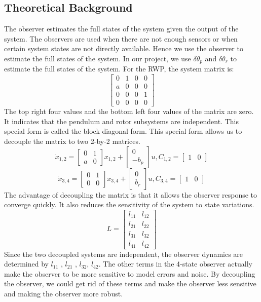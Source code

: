 \subsection{Theoretical Background}
The observer estimates the full states of the system given the output of the system. The observers are used when there are not enough sensors or when certain system states are not directly available. Hence we use the observer to estimate the full states of the system.  In our project, we use $\delta\theta_p$ and $\delta\theta_r$ to estimate the full states of the system.
For the RWP, the system matrix is:
$$
\begin{bmatrix}
0 & 1 & 0 & 0\\
a & 0 & 0 & 0\\
0 & 0 & 0 & 1\\
0 & 0 & 0 & 0
\end{bmatrix}
$$
The top right four values and the bottom left four values of the matrix are zero. It indicates that the pendulum and rotor subsystems are independent. This special form is called the block diagonal form. This special form allows us to decouple the matrix to two 2-by-2 matrices.
$$\dot x_{1,2} = 
\begin{bmatrix}
0 & 1 \\
a & 0
\end{bmatrix}
 x_{1,2}
+
\begin{bmatrix}
0 \\
-b_p
\end{bmatrix}
u, 
C_{1,2} = 
\begin{bmatrix}
1 & 0
\end{bmatrix}
$$
$$\dot x_{3,4} = 
\begin{bmatrix}
0 & 1\\
0 & 0
\end{bmatrix}
 x_{3,4}
+
\begin{bmatrix}
0 \\
b_r
\end{bmatrix}
u, 
C_{3,4} = 
\begin{bmatrix}
1 & 0
\end{bmatrix}
$$
The advantage of decoupling the matrix is that it allows the observer response to converge quickly. It also reduces the sensitivity of the system to state variations.\\
$$
L = 
\begin{bmatrix}
l_{11} & l_{12}\\
l_{21} & l_{22}\\
l_{31} & l_{32}\\
l_{41} & l_{42}
\end{bmatrix}
$$
Since the two decoupled systems are independent, the observer dynamics are determined by $l_{11}$ , $l_{21}$ , $l_{32}$, $l_{42}$. The other terms in the 4-state observer actually make the observer to be more sensitive to model errors and noise. By decoupling the observer, we could get rid of these terms and make the observer less sensitive and making the observer more robust.
